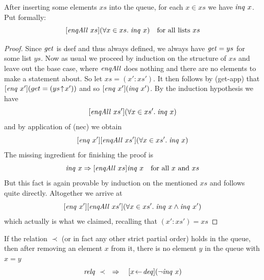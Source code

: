 \begin{lem}
\label{thm:enqAll-inq}
After inserting some elements $xs$ into the queue, for each $x\in xs$ we have
$\mathit{inq}~x$. Put formally:
\[
[\mathit{enqAll}~xs](\forall x\in xs.\; \mathit{inq}~x) \quad \text{for all lists $xs$}
\]
\end{lem}
\begin{proof}
  Since $\mathit{get}$ is dsef and thus always defined, we always have $\mathit{get} = ys$ for
  some list $ys$. Now as usual we proceed by induction on the structure of $xs$ and
  leave out the base case, where $\mathit{enqAll}$ does nothing and there are no
  elements to make a statement about. So let $xs = (x':xs')$.  It then follows
  by (get-app) that $[\mathit{enq}~x'](get = (ys \!\uparrow\! x'))$ and so $[\mathit{enq}~x'](\mathit{inq}~x')$. By
  the induction hypothesis we have
\[
[\mathit{enqAll}~xs'](\forall x\in xs'.\; \mathit{inq}~x)
\]
and by application of (nec) we obtain
\[
[\mathit{enq}~x'][\mathit{enqAll}~xs'](\forall x\in xs'.\; \mathit{inq}~x)
\]
The missing ingredient for finishing the proof is
\[
\mathit{inq}~x \Rightarrow [\mathit{enqAll}~xs]\mathit{inq}~x \quad \text{for all $x$ and $xs$}
\]
But this fact is again provable by induction on the mentioned $xs$ and follows
quite directly. Altogether we arrive at
\[
[\mathit{enq}~x'][\mathit{enqAll}~xs'](\forall x\in xs'.\; \mathit{inq}~x \land \mathit{inq}~x')
\]
which actually is what we claimed, recalling that $(x':xs') = xs$
\end{proof}







\begin{lem}
\label{deq-inq}
If the relation $\prec$ (or in fact any other strict partial order) holds in the
queue, then after removing an element $x$ from it, there is no element $y$ in
the queue with $x = y$
\[
\mathit{relq}~\prec \quad\Rightarrow\quad [x \!\gets\! \mathit{deq}](\lnot \mathit{inq}~x)
\]
\end{lem}


